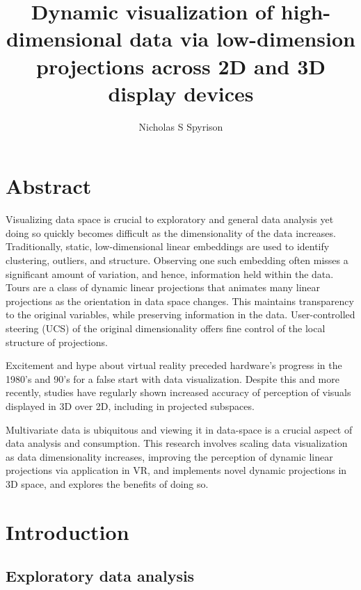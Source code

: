 \documentclass{monashthesis}
\author{Nicholas S Spyrison}
\title{Dynamic visualization of high-dimensional data via low-dimension
projections across 2D and 3D display devices}
\begin{document}

\titlepage

{\sf\tighttoc\doublespacing}

\chapter*{Abstract}\label{abstract}

Visualizing data space is crucial to exploratory and general data
analysis yet doing so quickly becomes difficult as the dimensionality of
the data increases. Traditionally, static, low-dimensional linear
embeddings are used to identify clustering, outliers, and structure.
Observing one such embedding often misses a significant amount of
variation, and hence, information held within the data. Tours are a
class of dynamic linear projections that animates many linear
projections as the orientation in data space changes. This maintains
transparency to the original variables, while preserving information in
the data. User-controlled steering (UCS) of the original dimensionality
offers fine control of the local structure of projections.

Excitement and hype about virtual reality preceded hardware's progress
in the 1980's and 90's for a false start with data visualization.
Despite this and more recently, studies have regularly shown increased
accuracy of perception of visuals displayed in 3D over 2D, including in
projected subspaces.

Multivariate data is ubiquitous and viewing it in data-space is a
crucial aspect of data analysis and consumption. This research involves
scaling data visualization as data dimensionality increases, improving
the perception of dynamic linear projections via application in VR, and
implements novel dynamic projections in 3D space, and explores the
benefits of doing so.

\clearpage{}\setcounter{page}{0}

\chapter{Introduction}\label{ch:introduction}

\section{Exploratory data analysis}\label{exploratory-data-analysis}
\end{document}
